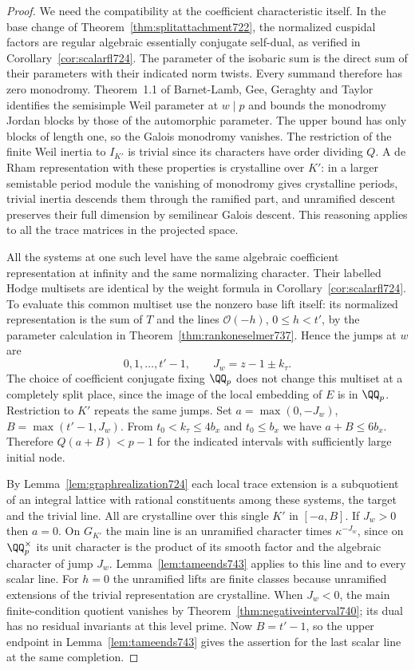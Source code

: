\documentclass[a4paper,11pt]{article}
\theoremstyle{definition}
\theoremstyle{remark}
\numberwithin{equation}{section}
\begin{document}
\begin{proof}
We need the compatibility at the coefficient characteristic itself.
In the base change of Theorem~\ref{thm:splitattachment722}, the
normalized cuspidal factors are regular algebraic essentially
conjugate self-dual, as verified in
Corollary~\ref{cor:scalarfl724}. The parameter of the isobaric
sum is the direct sum of their parameters with their indicated
norm twists. Every summand therefore has zero monodromy.
Theorem~1.1 of Barnet-Lamb, Gee, Geraghty and Taylor identifies
the semisimple Weil parameter at \(w\mid p\) and bounds the
monodromy Jordan blocks by those of the automorphic parameter.
The upper bound has only blocks of length one, so the Galois
monodromy vanishes. The restriction of the finite Weil inertia
to \(I_{K'}\) is trivial since its characters have order dividing
\(Q\). A de Rham representation with these properties is crystalline
over \(K'\): in a larger semistable period module the vanishing of
monodromy gives crystalline periods, trivial inertia descends
them through the ramified part, and unramified descent preserves
their full dimension by semilinear Galois descent. This reasoning
applies to all the trace matrices in the projected space.
~\cite[Theorem~1.1]{III-II-blggttame743}

All the systems at one such level have the same algebraic
coefficient representation at infinity and the same normalizing
character. Their labelled Hodge multisets are identical by the
weight formula in Corollary~\ref{cor:scalarfl724}. To evaluate
this common multiset use the nonzero base lift itself: its
normalized representation is the sum of \(T\) and the lines
\(\mathcal O(-h)\), \(0\le h<t'\), by the parameter calculation
in Theorem~\ref{thm:rankoneselmer737}. Hence the jumps at \(w\) are
\[
              0,1,\ldots,t'-1,\qquad J_w=z-1\pm k_\tau .
\]
The choice of coefficient conjugate fixing \(\QQ_p\) does not
change this multiset at a completely split place, since the image
of the local embedding of \(E\) is in \(\QQ_p\). Restriction to
\(K'\) repeats the same jumps. Set
\(a=\max(0,-J_w)\), \(B=\max(t'-1,J_w)\). From
\(t_0<k_\tau\le4b_x\) and \(t_0\le b_x\) we have
\(a+B\le 6b_x\). Therefore \(Q(a+B)<p-1\) for the indicated
intervals with sufficiently large initial node.

By Lemma~\ref{lem:graphrealization724} each local trace extension
is a subquotient of an integral lattice with rational constituents
among these systems, the target and the trivial line. All are
crystalline over this single \(K'\) in \([-a,B]\). If \(J_w>0\)
then \(a=0\). On \(G_{K'}\) the main line is an unramified
character times \(\kappa^{-J_w}\), since on \(\QQ_p^\times\) its
unit character is the product of its smooth factor and the
algebraic character of jump \(J_w\). Lemma~\ref{lem:tameends743}
applies to this line and to every scalar line. For \(h=0\) the
unramified lifts are finite classes because unramified extensions
of the trivial representation are crystalline. When \(J_w<0\),
the main finite-condition quotient vanishes by
Theorem~\ref{thm:negativeinterval740}; its dual has no residual
invariants at this level prime. Now \(B=t'-1\), so the upper
endpoint in Lemma~\ref{lem:tameends743} gives the assertion for
the last scalar line at the same completion.
\end{proof}
\end{document}
